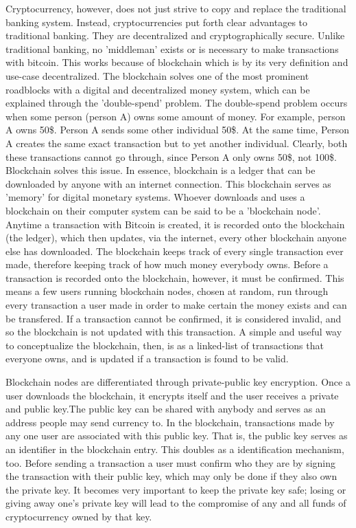 \documentclass[]{article}
\begin{document}
Cryptocurrency, however, does not just strive to copy and replace the traditional banking system. Instead, cryptocurrencies put forth clear advantages to traditional banking. They are decentralized and cryptographically secure. Unlike traditional banking, no 'middleman' exists or is necessary to make transactions with bitcoin. This works because of blockchain which is by its very definition and use-case decentralized. The blockchain solves one of the most prominent roadblocks with a digital and decentralized money system, which can be explained through the 'double-spend' problem. The double-spend problem occurs when some person (person A) owns some amount of money. For example, person A owns 50\$. Person A sends some other individual 50\$. At the same time, Person A creates the same exact transaction but to yet another individual. Clearly, both these transactions cannot go through, since Person A only owns 50\$, not 100\$. Blockchain solves this issue. In essence, blockchain is a ledger that can be downloaded by anyone with an internet connection. This blockchain serves as 'memory' for digital monetary systems. Whoever downloads and uses a blockchain on their computer system can be said to be a 'blockchain node'. Anytime a transaction with Bitcoin is created, it is recorded onto the blockchain (the ledger), which then updates, via the internet, every other blockchain anyone else has downloaded. The blockchain keeps track of every single transaction ever made, therefore keeping track of how much money everybody owns.  Before a transaction is recorded onto the blockchain, however, it must be confirmed. This means a few users running blockchain nodes, chosen at random, run through every transaction a user made in order to make certain the money exists and can be transfered. If a transaction cannot be confirmed, it is considered invalid, and so the blockchain is not updated with this transaction. A simple and useful way to conceptualize the blockchain, then, is as a linked-list of transactions that everyone owns, and is updated if a transaction is found to be valid.

Blockchain nodes are differentiated through private-public key encryption. Once a user downloads the blockchain, it encrypts itself and the user receives a private and public key.The public key can be shared with anybody and serves as an address people may send currency to. In the blockchain, transactions made by any one user are associated with this public key. That is, the public key serves as an identifier in the blockchain entry. This doubles as a identification mechanism, too. Before sending a transaction a user must confirm who they are by signing the transaction with their public key, which may only be done if they also own the private key. It becomes very important to keep the private key safe; losing or giving away one's private key will lead to the compromise of any and all funds of cryptocurrency owned by that key. 
\end{document}
